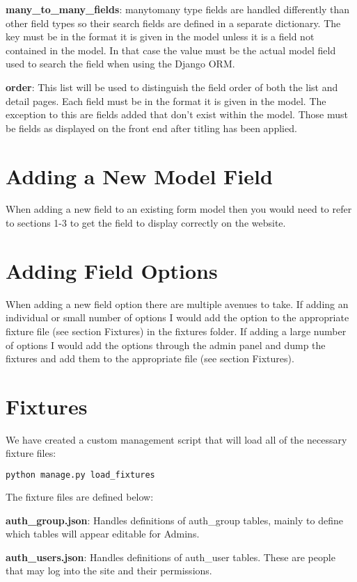 \documentclass{article}
\begin{document}
\textbf{many\_to\_many\_fields}: manytomany type fields are handled differently than other field types so their search fields are defined in a separate dictionary. The key must be in the format it is given in the model unless it is a field not contained in the model. In that case the value must be the actual model field used to search the field when using the Django ORM.

\textbf{order}: This list will be used to distinguish the field order of both the list and detail pages.  Each field must be in the format it is given in the model.  The exception to this are fields added that don't exist within the model. Those must be fields as displayed on the front end after titling has been applied.

\section{Adding a New Model Field}
When adding a new field to an existing form model then you would need to refer to sections 1-3 to get the field to display correctly on the website.

\section{Adding Field Options}
When adding a new field option there are multiple avenues to take.  If adding an individual or small number of options I would add the option to the appropriate fixture file (see section Fixtures) in the fixtures folder. If adding a large number of options I would add the options through the admin panel and dump the fixtures and add them to the appropriate file (see section Fixtures).

\section{Fixtures}
We have created a custom management script that will load all of the necessary fixture files:
\begin{lstlisting}[language=bash]
  python manage.py load_fixtures
\end{lstlisting}
The fixture files are defined below:

\textbf{auth\_group.json}: Handles definitions of auth\_group tables, mainly to define which tables will appear editable for Admins.

\textbf{auth\_users.json}: Handles definitions of auth\_user tables. These are people that may log into the site and their permissions.
\end{document}
